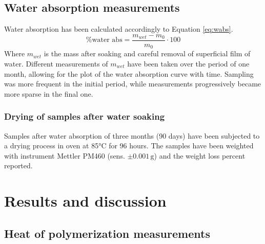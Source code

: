 \documentclass[a4paper, 11pt]{article}
\begin{document}
\subsection{Water absorption measurements}

Water absorption has been calculated accordingly to Equation \ref{eq:wabs}.
\begin{equation}
\%\text{water abs} = \frac{m_{wet}-m_0}{m_0}\cdot 100
\label{eq:wabs} 
\end{equation}
Where $m_{wet}$ is the mass after soaking and careful removal of superficial film of water. Different measurements of $m_{wet}$ have been taken over the period of one month, allowing for the plot of the water absorption curve with time. Sampling was more frequent in the initial period, while measurements progressively became more sparse in the final one. 

\subsubsection{Drying of samples after water soaking}

Samples after water absorption of three months (90 days) have been subjected to a drying process in oven at 85°C for 96 hours. The samples have been weighted with instrument Mettler PM460 (sens. $\pm 0.001\,\text{g}$) and the weight loss percent reported. 

\newpage
\section{Results and discussion}

\subsection{Heat of polymerization measurements}
\end{document}
